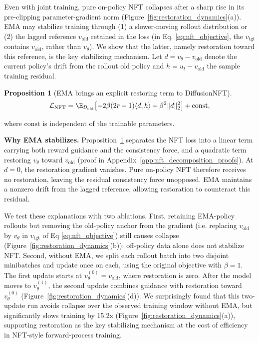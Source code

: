 \documentclass{article}
\newtheorem{proposition}{Proposition}
\begin{document}
Even with joint training, pure on-policy NFT collapses after a sharp rise in its pre-clipping parameter-gradient norm (Figure~\ref{fig:restoration_dynamics}(a)). EMA may stabilize training through (1) a slower-moving rollout distribution or (2) the lagged reference $v_{\mathrm{old}}$ retained in the loss (in Eq. \ref{eq:nft_objective}, the $v_{\mathrm{tgt}}$ contains $v_{\mathrm{old}}$, rather than $v_{\theta}$). We show that the latter, namely restoration toward this reference, is the key stabilizing mechanism. Let $d=v_\theta-v_{\mathrm{old}}$ denote the current policy's drift from the rollout old policy and $h=u_t-v_{\mathrm{old}}$ the sample training residual.

\begin{proposition}[EMA brings an explicit restoring term to DiffusionNFT]
\label{prop:nft_guidance_restore}
\begin{equation}
\mathcal L_{\mathrm{NFT}}
=\E_{\mathcal D_{\mathrm{old}}}\!\left[-2\beta(2r-1)
\langle d,h\rangle
+\beta^2\lVert d\rVert_2^2\right]+\mathrm{const},
\label{eq:nft_guidance_restore_decomposition}
\end{equation}
\end{proposition}

where $\mathrm{const}$ is independent of the trainable parameters.

\noindent\textbf{Why EMA stabilizes.} Proposition~\ref{prop:nft_guidance_restore} separates the NFT loss into a linear term carrying both reward guidance and the consistency force, and a quadratic term restoring $v_\theta$ toward $v_{\mathrm{old}}$ (proof in Appendix~\ref{app:nft_decomposition_proofs}). At $d=0$, the restoration gradient vanishes. Pure on-policy NFT therefore receives no restoration, leaving the residual consistency force unopposed. EMA maintains a nonzero drift from the lagged reference, allowing restoration to counteract this residual.

We test these explanations with two ablations. First, retaining EMA-policy rollouts but removing the old-policy anchor from the gradient (i.e. replacing $v_{\mathrm{old}}$ by $v_{\theta}$ in $v_{\mathrm{tgt}}$ of Eq \ref{eq:nft_objective}) still causes collapse (Figure~\ref{fig:restoration_dynamics}(b)): off-policy data alone does not stabilize NFT. Second, without EMA, we split each rollout batch into two disjoint minibatches and update once on each, using the original objective with $\beta=1$. The first update starts at $v_\theta^{(0)}=v_{\mathrm{old}}$, where restoration is zero. After the model moves to $v_\theta^{(1)}$, the second update combines guidance with restoration toward $v_\theta^{(0)}$ (Figure~\ref{fig:restoration_dynamics}(d)). We surprisingly found that this two-update run avoids collapse over the observed training window without EMA, but significantly slows training by 15.2x (Figure~\ref{fig:restoration_dynamics}(a)), supporting restoration as the key stabilizing mechanism at the cost of efficiency in NFT-style forward-process training.
\end{document}

